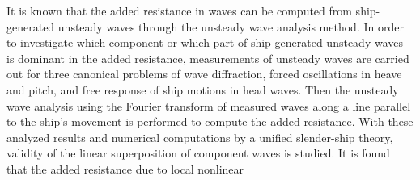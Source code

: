 \documentclass[11pt,fleqn,a3]{article}
\begin{document}
\baselineskip \mybaselineskip
{}
\footnotesize\par{}\par\vspace*{2.0mm}
\baselineskip \mybaselineskip
%
It is known that the added resistance in waves can be computed from 
ship-generated unsteady waves through the unsteady wave analysis method.
In order to investigate which component or which part of ship-generated 
unsteady waves is dominant in the added resistance, measurements of 
unsteady waves are carried out 
for three canonical problems of wave diffraction, forced oscillations 
in heave and pitch, and free response of ship motions in head waves.
Then the unsteady wave analysis using the 
Fourier transform of measured waves along a line parallel to 
the ship's movement is performed to compute the added resistance.
With these analyzed results and numerical computations by a 
unified slender-ship theory, 
validity of the linear superposition of 
component waves is studied.
It is found that the added resistance due to local nonlinear 
\end{document}
